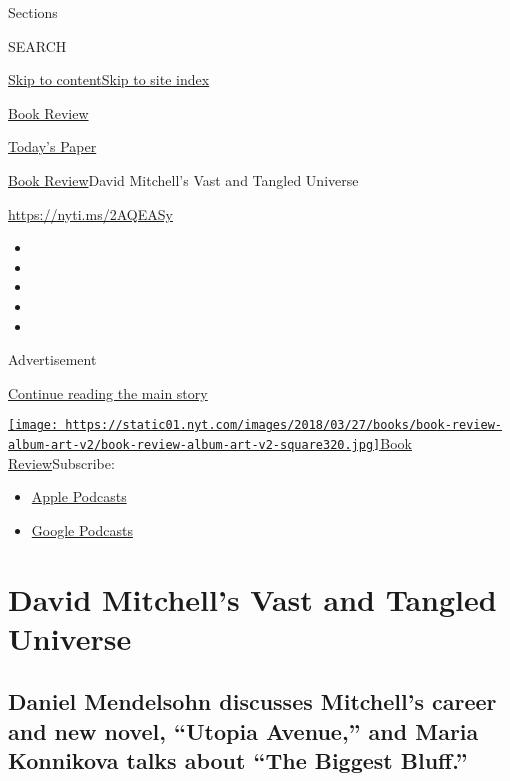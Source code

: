 Sections

SEARCH

\protect\hyperlink{site-content}{Skip to
content}\protect\hyperlink{site-index}{Skip to site index}

\href{https://www.nytimes.com/section/books/review}{Book Review}

\href{https://myaccount.nytimes.com/auth/login?response_type=cookie\&client_id=vi}{}

\href{https://www.nytimes.com/section/todayspaper}{Today's Paper}

\href{/section/books/review}{Book Review}\textbar{}David Mitchell's Vast
and Tangled Universe

\url{https://nyti.ms/2AQEASy}

\begin{itemize}
\item
\item
\item
\item
\item
\end{itemize}

Advertisement

\protect\hyperlink{after-top}{Continue reading the main story}

\href{https://www.nytimes.com/column/book-review-podcast}{\texttt{[image: https://static01.nyt.com/images/2018/03/27/books/book-review-album-art-v2/book-review-album-art-v2-square320.jpg]}Book
Review}Subscribe:

\begin{itemize}
\tightlist
\item
  \href{https://itunes.apple.com/us/podcast/id120315179}{Apple Podcasts}
\item
  \href{https://www.google.com/podcasts?feed=aHR0cHM6Ly9yc3MuYXJ0MTkuY29tL2Jvb2stcmV2aWV3}{Google
  Podcasts}
\end{itemize}

\hypertarget{david-mitchells-vast-and-tangled-universe}{%
\section{David Mitchell's Vast and Tangled
Universe}\label{david-mitchells-vast-and-tangled-universe}}

\hypertarget{daniel-mendelsohn-discusses-mitchells-career-and-new-novel-utopia-avenue-and-maria-konnikova-talks-about-the-biggest-bluff}{%
\subsection{Daniel Mendelsohn discusses Mitchell's career and new novel,
``Utopia Avenue,'' and Maria Konnikova talks about ``The Biggest
Bluff.''}\label{daniel-mendelsohn-discusses-mitchells-career-and-new-novel-utopia-avenue-and-maria-konnikova-talks-about-the-biggest-bluff}}

